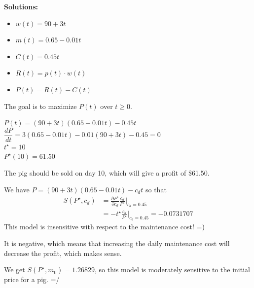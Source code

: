 \documentclass{workbook}
\begin{document}
\begin{solution}
\begin{slide}
\textbf{Solutions:}
\begin{parts}
	\item 
	\begin{itemize}
 		\item $w(t) = 90 + 3t$
 		\item $m(t) = 0.65-0.01t$
 		\item $C(t) = 0.45t$
 		\item $R(t) = p(t) \cdot w(t)$
 		\item $P(t) = R(t) - C(t)$
 	\end{itemize}
 	\item The goal is to maximize $P(t)$ over $t\geq 0$.
 	\item 	$P(t) = (90+3t)(0.65-0.01t) - 0.45t$ \\
			$\dfrac{dP}{dt} = 3(0.65-0.01t)-0.01(90+3t) - 0.45 = 0$\\
 			$t^\star = 10$ \\	
 			$P^\star(10) = 61.50$
 	\item The pig should be sold on day 10, which will give a profit of \$61.50.

%
	\item We have $P = (90+3t)(0.65-0.01t) - c_dt$ so that
		\begin{align*}
		S(P^\star,c_d) 
			& = \frac{\partial P^\star}{\partial c_d} \frac{c_d}{P^\star} \big|_{c_d=0.45} \\
			& = - t^\star \frac{c_d}{P^\star} \big|_{c_d=0.45}
			= -0.0731707
		\end{align*}
		This model is insensitive with respect to the maintenance cost! =)
	\item It is negative, which means that increasing the daily maintenance cost will decrease the profit, which makes sense.
	
	\item We get $S(P^\star,m_0) = 1.26829$, so
%
%
		this model is moderately sensitive to the initial price for a pig. =/
		

\end{parts}
\end{slide}
\end{solution}
\end{document}
